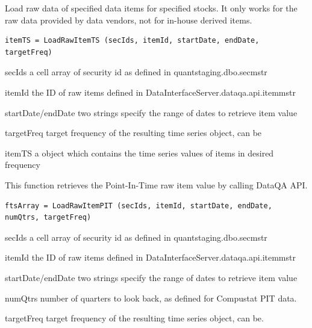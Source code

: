    Load raw data of specified data items for specified stocks.
   It only works for the raw data provided by data vendors, not for in-house derived items. 
 
\usage
   \begin{lstlisting}[numbers=none]
     itemTS = LoadRawItemTS (secIds, itemId, startDate, endDate, targetFreq)
   \end{lstlisting}

\inarg
   \begin{argdesc}
	  \item[secIds] a cell array of security id as defined in quantstaging.dbo.secmstr
	  \item[itemId] the ID of raw items defined in DataInterfaceServer.dataqa.api.itemmstr  
	  \item[startDate/endDate] two strings specify the range of dates to retrieve item value
	  \item[targetFreq] target frequency of the resulting time series object, can be
         
   \end{argdesc}
 
\outarg
   \begin{argdesc}
 	  \item[itemTS] a \myfints{} object which contains the time series values of items in desired frequency
   \end{argdesc}

   This function retrieves the Point-In-Time raw item value by calling DataQA API. 

\usage
   \begin{lstlisting}[numbers=none]
   ftsArray = LoadRawItemPIT (secIds, itemId, startDate, endDate, numQtrs, targetFreq)
   \end{lstlisting}

\inarg
   \begin{argdesc}
   \item[secIds] a cell array of security id as defined in quantstaging.dbo.secmstr
   \item[itemId] the ID of raw items defined in DataInterfaceServer.dataqa.api.itemmstr  
   \item[startDate/endDate] two strings specify the range of dates to retrieve item value
   \item[numQtrs] number of quarters to look back, as defined for Compustat PIT data.
   \item[targetFreq] target frequency of the resulting time series object, can be.
         
\end{argdesc}
          
